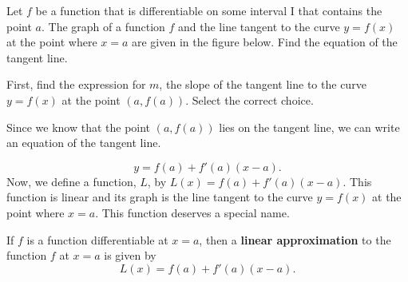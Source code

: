 \documentclass{ximera}
\begin{document}
\begin{example}
	Let $f$ be a function that is differentiable on some interval I that contains the point $a$. 
	The graph of a function $f$  and the line tangent to the curve
	$y=f(x)$ at the point where $x=a$ are given in the figure below. Find the equation of the tangent line.
	 \begin{image}
	\end{image}
	First, find the expression for $m$, the slope of the tangent line to the curve $y=f(x)$ at the point $(a,f(a))$.
	 Select the correct choice.
	 \begin{multipleChoice}
	  \end{multipleChoice}
	Since we know that the point $(a,f(a))$  lies on the tangent line,  we can write an equation of the tangent line. 
	
	\[
	y= f(a)+f'(a)(x-a).
	\]
	Now, we define a function, $L$,  by $L(x)= f(a)+f'(a)(x-a)$. This function is linear and its graph is the line tangent to the curve $y=f(x)$ at the point where $x=a$.
	This function deserves a special name.
\end{example}
\begin{definition}
If $f$ is a function differentiable at $x=a$, then a \textbf{linear
  approximation} to the function $f$ at $x=a$ is given by
\[
L(x) =f(a)+ f'(a)(x-a).
\]
\end{definition}
\end{document}
